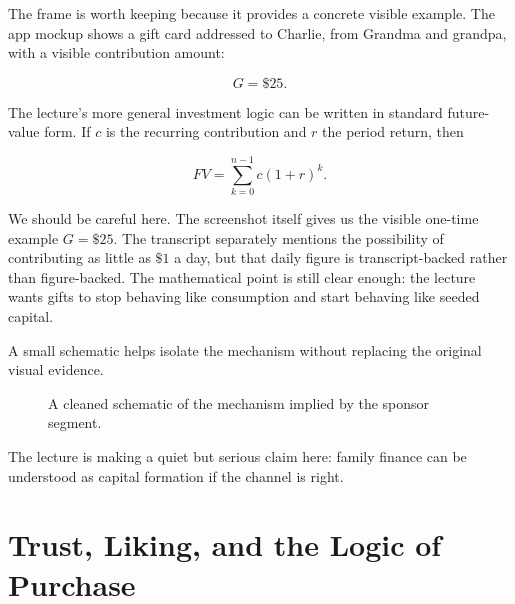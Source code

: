 The frame is worth keeping because it provides a concrete visible example. The app mockup shows a gift card addressed to Charlie, from Grandma and grandpa, with a visible contribution amount:

\begin{equation}
G = \$25.
\end{equation}

The lecture's more general investment logic can be written in standard future-value form. If \(c\) is the recurring contribution and \(r\) the period return, then

\begin{equation}
FV = \sum_{k=0}^{n-1} c(1+r)^k.
\end{equation}

We should be careful here. The screenshot itself gives us the visible one-time example \(G=\$25\). The transcript separately mentions the possibility of contributing as little as \(\$1\) a day, but that daily figure is transcript-backed rather than figure-backed. The mathematical point is still clear enough: the lecture wants gifts to stop behaving like consumption and start behaving like seeded capital.

A small schematic helps isolate the mechanism without replacing the original visual evidence.

\begin{figure}[h]
\centering
{}
\caption{A cleaned schematic of the mechanism implied by the sponsor segment.}
\end{figure}

The lecture is making a quiet but serious claim here: family finance can be understood as capital formation if the channel is right.

\section{Trust, Liking, and the Logic of Purchase}

